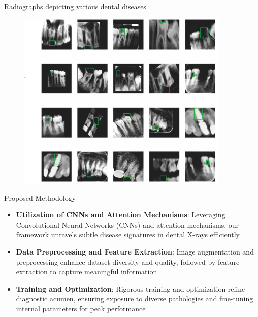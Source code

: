 \documentclass{beamer}
\begin{document}
\begin{frame}{Radiographs depicting various dental diseases}
	\begin{figure}[!t]
		\centerline{\includegraphics[width=0.9\textwidth]{../ss-teeth-full.png}}
	\end{figure}
\end{frame}

\begin{frame}{Proposed Methodology}
	\begin{itemize}
	\vfill
	\item \textbf{Utilization of CNNs and Attention Mechanisms}: Leveraging Convolutional Neural Networks (CNNs) and attention mechanisms, our framework unravels subtle disease signatures in dental X-rays efficiently	
	\vfill 
	\item \textbf{Data Preprocessing and Feature Extraction}: Image augmentation and preprocessing enhance dataset diversity and quality, followed by feature extraction to capture meaningful information
	\vfill
	\item \textbf{Training and Optimization}: Rigorous training and optimization refine diagnostic acumen, ensuring exposure to diverse pathologies and fine-tuning internal parameters for peak performance
	\end{itemize}
\end{frame}
\end{document}

